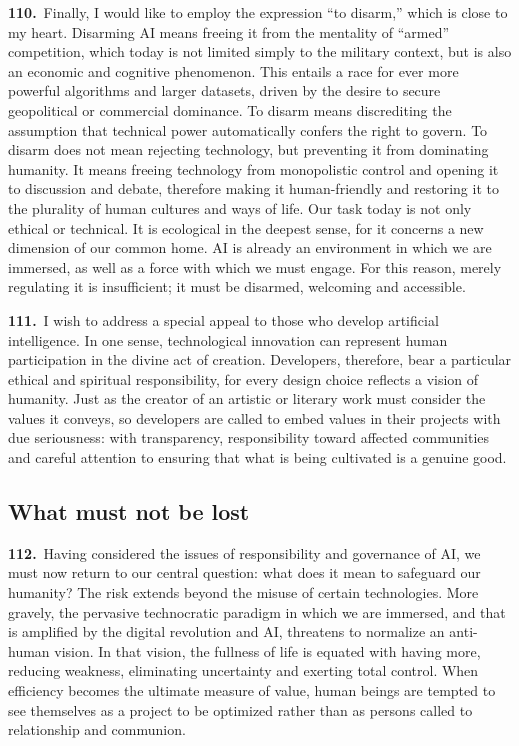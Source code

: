 \documentclass{article}
\begin{document}
\textbf{110.}\ Finally, I would like to employ the expression ``to disarm,'' which is close to my heart. Disarming AI means freeing it from the mentality of ``armed'' competition, which today is not limited simply to the military context, but is also an economic and cognitive phenomenon. This entails a race for ever more powerful algorithms and larger datasets, driven by the desire to secure geopolitical or commercial dominance. To disarm means discrediting the assumption that technical power automatically confers the right to govern. To disarm does not mean rejecting technology, but preventing it from dominating humanity. It means freeing technology from monopolistic control and opening it to discussion and debate, therefore making it human-friendly and restoring it to the plurality of human cultures and ways of life. Our task today is not only ethical or technical. It is ecological in the deepest sense, for it concerns a new dimension of our common home. AI is already an environment in which we are immersed, as well as a force with which we must engage. For this reason, merely regulating it is insufficient; it must be disarmed, welcoming and accessible.

\textbf{111.}\ I wish to address a special appeal to those who develop artificial intelligence. In one sense, technological innovation can represent human participation in the divine act of creation. Developers, therefore, bear a particular ethical and spiritual responsibility, for every design choice reflects a vision of humanity. Just as the creator of an artistic or literary work must consider the values it conveys, so developers are called to embed values in their projects with due seriousness: with transparency, responsibility toward affected communities and careful attention to ensuring that what is being cultivated is a genuine good.

\subsection{What must not be lost}

\textbf{112.}\ Having considered the issues of responsibility and governance of AI, we must now return to our central question: what does it mean to safeguard our humanity? The risk extends beyond the misuse of certain technologies. More gravely, the pervasive technocratic paradigm in which we are immersed, and that is amplified by the digital revolution and AI, threatens to normalize an anti-human vision. In that vision, the fullness of life is equated with having more, reducing weakness, eliminating uncertainty and exerting total control. When efficiency becomes the ultimate measure of value, human beings are tempted to see themselves as a project to be optimized rather than as persons called to relationship and communion.
\end{document}

